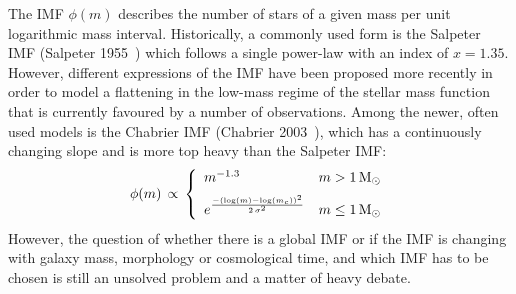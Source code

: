 \documentclass[galaxies,letter,accept,moreauthors,pdftex,10pt,a4paper,usenatbib]{mdpi}
\begin{document}
The IMF $\phi(m)$ describes the number of stars of a given mass per
unit logarithmic mass interval. Historically, a commonly used form is
the Salpeter IMF (Salpeter 1955~\cite{1955ApJ...121..161S}) which
follows a single power-law with an index of $x=1.35$. However,
different expressions of the IMF have been proposed more recently in
order to model a flattening in the low-mass regime of the stellar mass
function that is currently favoured by a number of observations. Among
the newer, often used models is the Chabrier IMF (Chabrier
2003~\cite{2003PASP..115..763C}), which has a continuously changing
slope and is more top heavy than the Salpeter IMF:
\begin{equation}
\phi(m)\, \propto \, \left\{\begin{array}{ll}
m^{-1.3} & m > 1\, {\rm M}_\odot\\
\vspace{-0.2cm}&\\
e^{\frac{-\left(\log(m) -
        \log(m_c)\right)^2}{2\, \sigma^2}} & m \le 1\, {\rm
  M}_\odot\\
\end{array}\right.
\label{Chabrier}
\end{equation}
However, the question of whether there is a global IMF or if the IMF
is changing with galaxy mass, morphology or cosmological time, and
which IMF has to be chosen is still an unsolved problem and a matter
of heavy debate.
\end{document}
